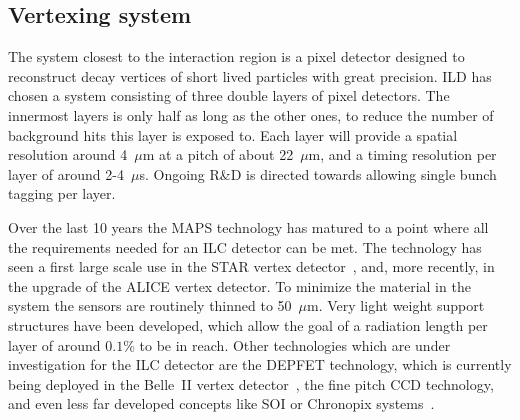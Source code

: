\documentclass[%
 amsmath,amssymb,
 aps,
]{revtex4-1}
\begin{document}
\subsection{Vertexing system}
The system closest to the interaction region is a pixel detector designed to reconstruct decay vertices of short lived particles with great precision. ILD has chosen a system consisting of three double layers of pixel detectors. The innermost layers is only half as long as the other ones, to reduce the number of background hits this layer is exposed to. Each layer will provide a spatial resolution around 4~$\mu$m at a pitch of about 22~$\mu$m, and a timing resolution per layer of around 2-4~$\mu$s. Ongoing R\&D is directed towards allowing single bunch tagging per layer. 

Over the last 10 years the MAPS technology has matured to a point where all the requirements needed for an ILC detector can be met. The technology has seen a first large scale use in the STAR vertex detector~\cite{ild:bib:VTXcps3}, and, more recently, in the upgrade of the ALICE vertex detector. To minimize the material in the system the sensors are routinely thinned to 50~$\mu$m. Very light weight support structures have been developed, which allow the goal of a radiation length per layer of around $0.1 \%$ to be in reach. 
Other technologies which are under investigation for the ILC detector are the DEPFET technology, which is currently being deployed in the Belle~II vertex detector~\cite{Luetticke:2017zpx}, the fine pitch CCD technology, and even less far developed concepts like SOI or Chronopix systems~\cite{RDliaision}. 
\end{document}
